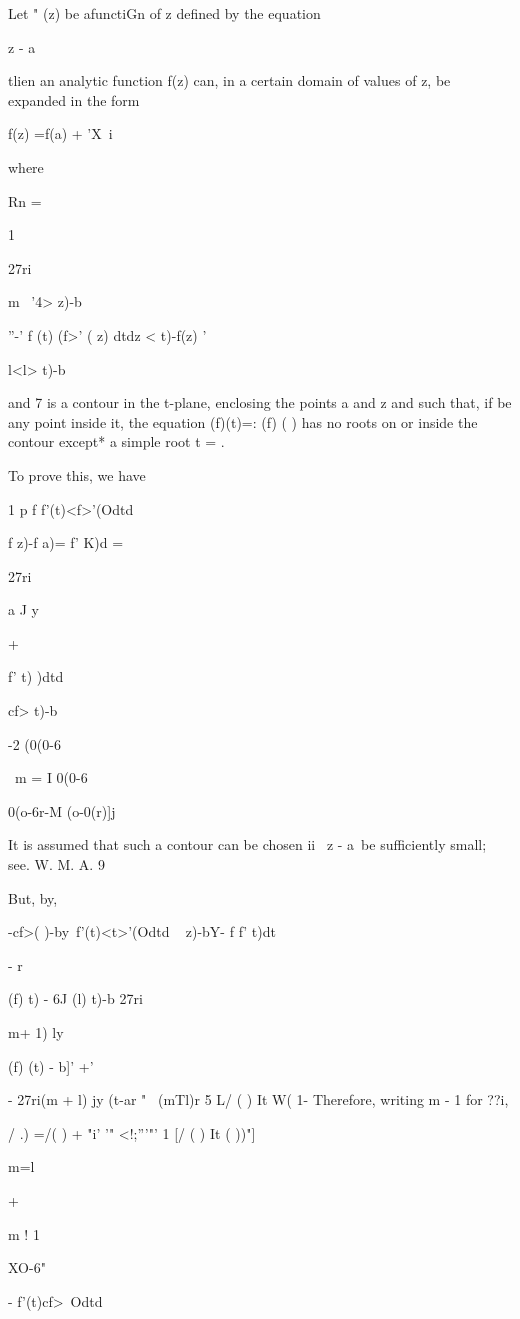 Let " (z) be afunctiGn of z defined by the equation 

z - a

tlien an analytic function f(z) can, in a certain domain of values of
z, be expanded in the form

f(z) =f(a) + 'X\ i %

where

Rn =

1

27ri

m \ '4> z)-b

''-' f (t) (f>' ( z) dtdz < t)-f(z) '

l<l> t)-b\

and 7 is a contour in the t-plane, enclosing the points a and z and
such that, if be any point inside it, the equation (f)(t)=: (f) ( )
has no roots on or inside the contour except* a simple root t = .

To prove this, we have

1 p f f'(t)<f>'(Odtd

f z)-f a)= f' K)d =

27ri

a J y

+

f' t) )dtd

cf> t)-b

-2 (0(0-6

\ m = I 0(0-6

 0(o-6r-M (o-0(r)]j

It is assumed that such a contour can be chosen ii \ z - a\ be
sufficiently small; see. W. M. A. 9

%
%

But, by,

-cf>( )-by\ f'(t)<t>'(Odtd \ < > z)-bY- f f' t)dt

- r

(f) t) - 6J (l) t)-b 27ri

 m+ 1) ly

 (f) (t) - b]' +'

- 27ri(m + l) jy (t-ar " ~(mTl)r 5 L/ ( ) It W( 1- Therefore, writing
m - 1 for ??i,

/ .) =/( ) + "i' '" <!;'''"' 1 [/ ( ) It ( ))"]

m=l

+

m ! 1

XO-6"

- f'(t)cf>\ Odtd

